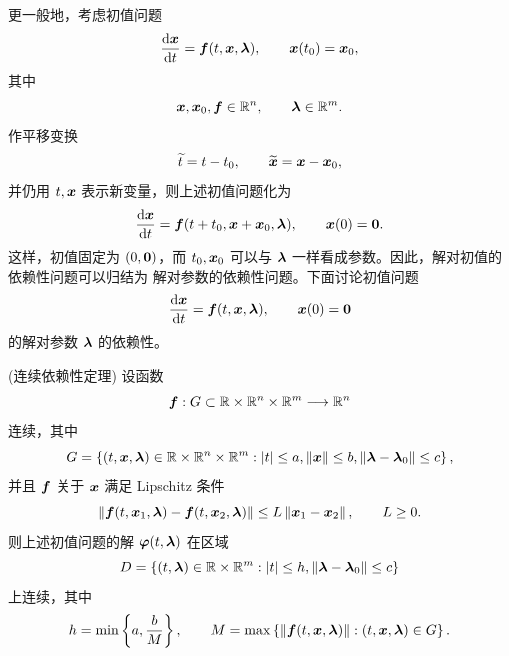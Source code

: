 更一般地，考虑初值问题
\[
	\dfrac{\mathrm{d}\boldsymbol{x}}{\mathrm{d} t}
	=\boldsymbol{f}(t,\boldsymbol{x},\boldsymbol{\lambda}),
	\qquad
	\boldsymbol{x}(t_0)=\boldsymbol{x}_0,
\]
其中
\[
	\boldsymbol{x},\boldsymbol{x}_0,\boldsymbol{f}\in\mathbb{R}^n,
	\qquad
	\boldsymbol{\lambda}\in\mathbb{R}^m.
\]
作平移变换
\[
	\widetilde{t}=t-t_0,
	\qquad
	\widetilde{\boldsymbol{x}}=\boldsymbol{x}-\boldsymbol{x}_0,
\]
并仍用 $t,\boldsymbol{x}$ 表示新变量，则上述初值问题化为
\[
	\dfrac{\mathrm{d}\boldsymbol{x}}{\mathrm{d} t}
	=\boldsymbol{f}(t+t_0,\boldsymbol{x}+\boldsymbol{x}_0,\boldsymbol{\lambda}),
	\qquad
	\boldsymbol{x}(0)=\boldsymbol{0}.
\]
这样，初值固定为 $(0,\boldsymbol{0})$，而 $t_0,\boldsymbol{x}_0$ 可以与
$\boldsymbol{\lambda}$ 一样看成参数。因此，解对初值的依赖性问题可以归结为
解对参数的依赖性问题。下面讨论初值问题
\[
	\dfrac{\mathrm{d}\boldsymbol{x}}{\mathrm{d} t}
	=\boldsymbol{f}(t,\boldsymbol{x},\boldsymbol{\lambda}),
	\qquad
	\boldsymbol{x}(0)=\boldsymbol{0}
\]
的解对参数 $\boldsymbol{\lambda}$ 的依赖性。

\begin{theorem}(连续依赖性定理)\label{thm:连续依赖性定理}
	设函数
	\[
		\boldsymbol{f}:G\subset\mathbb{R}\times\mathbb{R}^n\times\mathbb{R}^m\longrightarrow\mathbb{R}^n
	\]
	连续，其中
	\[
		G=\left\{
		(t,\boldsymbol{x},\boldsymbol{\lambda})\in\mathbb{R}\times\mathbb{R}^n\times\mathbb{R}^m:
		\left| t \right|\leq a,
		\left\| \boldsymbol{x} \right\|\leq b,
		\left\| \boldsymbol{\lambda}-\boldsymbol{\lambda}_0 \right\|\leq c
		\right\},
	\]
	并且 $\boldsymbol{f}$ 关于 $\boldsymbol{x}$ 满足 Lipschitz 条件
	\[
		\left\| 
		\boldsymbol{f}(t,\boldsymbol{x}_1,\boldsymbol{\lambda})
		-\boldsymbol{f}(t,\boldsymbol{x}_2,\boldsymbol{\lambda})
		 \right\|
		\leq L\left\| \boldsymbol{x}_1-\boldsymbol{x}_2 \right\|,
		\qquad L\geq0.
	\]
	则上述初值问题的解 $\boldsymbol{\varphi}(t,\boldsymbol{\lambda})$ 在区域
	\[
		D=\left\{
		(t,\boldsymbol{\lambda})\in\mathbb{R}\times\mathbb{R}^m:
		\left| t \right|\leq h,
		\left\| \boldsymbol{\lambda}-\boldsymbol{\lambda}_0 \right\|\leq c
		\right\}
	\]
	上连续，其中
	\[
		h=\min\left\{a,\dfrac{b}{M}\right\},
		\qquad
		M=\max\left\{
		\left\| \boldsymbol{f}(t,\boldsymbol{x},\boldsymbol{\lambda}) \right\|:
		(t,\boldsymbol{x},\boldsymbol{\lambda})\in G
		\right\}.
	\]
\end{theorem}

